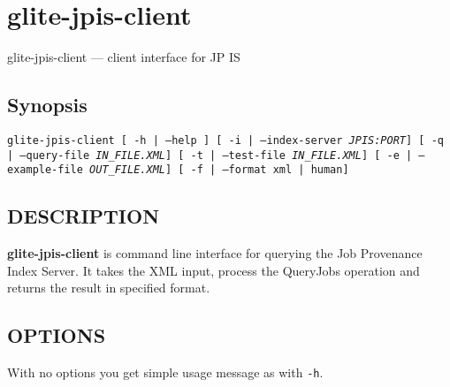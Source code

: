 % 
\section*{glite-jpis-client}
\label{glitejpisclient}\hypertarget{glitejpisclient}{}%
\label{name}

glite-jpis-client --- client interface for JP IS\label{synopsis}
\subsection*{Synopsis}
\label{id2455104}
\begin{list}{}{\setlength{\itemindent}{-\leftmargin}\setlength{\parsep}{0mm}}
\item\raggedright\texttt{glite-jpis-client [ -h | --help ] [ -i | --index-server  \textit{JPIS:PORT}] [ -q | --query-file  \textit{IN\_FILE.XML}] [ -t | --test-file  \textit{IN\_FILE.XML}] [ -e | --example-file  \textit{OUT\_FILE.XML}] [ -f | --format   {xml | human}]}
\end{list}

\subsection*{DESCRIPTION}
\label{id2417458}

{\bfseries{glite-jpis-client}} is command line interface for querying the Job Provenance Index Server. It takes the XML input, process the QueryJobs operation and returns the result in specified format.

\subsection*{OPTIONS}
\label{id2417597}

With no options you get simple usage message as with {\texttt{{-h}}}.


